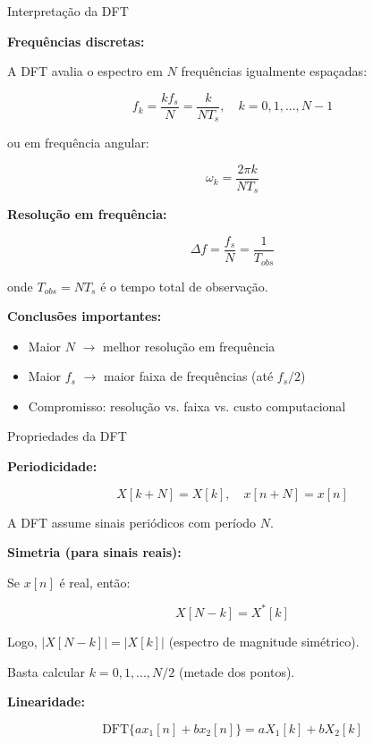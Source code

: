 \begin{frame}{Interpretação da DFT}

\textbf{Frequências discretas:}

A DFT avalia o espectro em $N$ frequências igualmente espaçadas:

\[
f_k = \frac{k f_s}{N} = \frac{k}{NT_s}, \quad k = 0, 1, ..., N-1
\]

ou em frequência angular:

\[
\omega_k = \frac{2\pi k}{N T_s}
\]

\textbf{Resolução em frequência:}

\[
\Delta f = \frac{f_s}{N} = \frac{1}{T_{obs}}
\]

onde $T_{obs} = NT_s$ é o tempo total de observação.

\vspace{0.1cm}

\textbf{Conclusões importantes:}

\begin{itemize}
\item Maior $N$ $\rightarrow$ melhor resolução em frequência
\item Maior $f_s$ $\rightarrow$ maior faixa de frequências (até $f_s/2$)
\item Compromisso: resolução vs. faixa vs. custo computacional
\end{itemize}

\end{frame}


\begin{frame}{Propriedades da DFT}

\textbf{Periodicidade:}

\[
X[k + N] = X[k], \quad x[n + N] = x[n]
\]

A DFT assume sinais periódicos com período $N$.

\vspace{0.1cm}

\textbf{Simetria (para sinais reais):}

Se $x[n]$ é real, então:

\[
X[N-k] = X^*[k]
\]

Logo, $|X[N-k]| = |X[k]|$ (espectro de magnitude simétrico).

Basta calcular $k = 0, 1, ..., N/2$ (metade dos pontos).

\vspace{0.1cm}

\textbf{Linearidade:}

\[
\text{DFT}\{ax_1[n] + bx_2[n]\} = aX_1[k] + bX_2[k]
\]

\end{frame}

